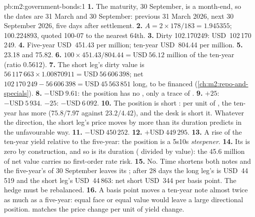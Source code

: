 \begin{solution}{pb:m2:government-bonds:1}
\textbf{1.} The maturity, 30 September, is a month-end, so the  dates
are 31 March and 30 September: previous 31 March 2026, next 30 September 2026,
five days after settlement.
\textbf{2.} $A = 2 \times 178/183 = 1.945355$;  100.224893, quoted
100-07 to the nearest 64th.
\textbf{3.} Dirty 102.170249: USD~102\,170\,249.
\textbf{4.} Five-year USD~451.43 per million; ten-year USD~804.44 per million.
\textbf{5.} 23.18 and 75.82.
\textbf{6.} $100 \times 451.43/804.44 = \text{USD}~56.12$ million of the ten-year
(ratio 0.5612).
\textbf{7.} The short leg's dirty value is $56\,117\,663 \times 1.00870911 =
\text{USD}~56\,606\,398$; net $102\,170\,249 - 56\,606\,398 = \text{USD}~45\,563\,851$
long, to be financed (\cref{ch:m2:repo-and-specials}).
\textbf{8.} $-\text{USD}~9.61$: the position has no , only a trace of
.
\textbf{9.} $+25$: $-\text{USD}~5\,934$. $-25$: $-\text{USD}~6\,092$.
\textbf{10.} The position is short : per unit of , the ten-year
has more  ($75.8/7.97$ against $23.2/4.42$), and the desk is short
it. Whatever the direction, the short leg's price moves by more than its
duration predicts in the unfavourable way.
\textbf{11.} $-\text{USD}~450\,252$.
\textbf{12.} $+\text{USD}~449\,295$.
\textbf{13.} A rise of the ten-year yield relative to the five-year: the
position is a 5s10s \emph{steepener}.
\textbf{14.} Its  is zero by construction, and so is its duration (
divided by value): the 45.6 million of net value carries no first-order rate
risk.
\textbf{15.} No. Time shortens both notes and the five-year's  of 30
September leaves its ; after 28 days the long leg's  is
USD~44\,519 and the short leg's USD~44\,863: net short USD~344 per basis point.
The hedge must be rebalanced.
\textbf{16.} A basis point moves a ten-year note almost twice as much as a
five-year: equal face or equal value would leave a large directional
position.  matches the price change per unit of yield change.

\end{solution}
